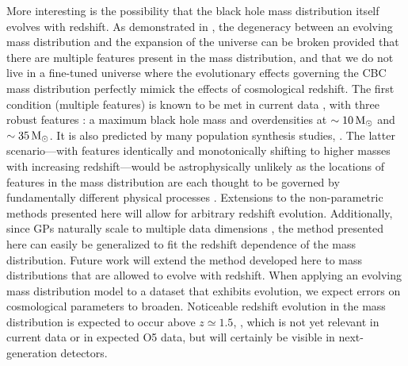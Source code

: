 \documentclass[preprint2,linenumbers]{aastex631}
\begin{document}
More interesting is the possibility that the black hole mass distribution itself evolves with redshift.
As demonstrated in \citet{ezquiaga_spectral_2022}, the degeneracy between an evolving mass distribution and the expansion of the universe can be broken provided that there are multiple features present in the mass distribution, and that we do not live in a fine-tuned universe where the evolutionary effects governing the \ac{CBC} mass distribution perfectly mimick the effects of cosmological redshift.
The first condition (multiple features) is known to be met in current data \citep{abbott_population_2023}, with three robust features \citep{farah_things_2023}: a maximum black hole mass and overdensities at $\sim10\,\text{M}_{\odot}$ and $\sim35\,\text{M}_{\odot}$.
It is also predicted by many population synthesis studies, \citep[e.g.][]{mapelli_cosmic_2018,giacobbo_merging_2018,van_son_locations_2023}.
The latter scenario---with features identically and monotonically shifting to higher masses with increasing redshift---would be astrophysically unlikely as the locations of features in the mass distribution are each thought to be governed by fundamentally different physical processes \citep{mapelli_binary_2020}.
Extensions to the non-parametric methods presented here will allow for arbitrary redshift evolution.
Additionally, since \aclp{GP} naturally scale to multiple data dimensions \citep{rasmussen_gaussian_2006}, the method presented here can easily be generalized to fit the redshift dependence of the mass distribution. 
Future work will extend the method developed here to mass distributions that are allowed to evolve with redshift.
When applying an evolving mass distribution model to a dataset that exhibits evolution, we expect errors on cosmological parameters to broaden.
Noticeable redshift evolution in the mass distribution is expected to occur above $z\simeq 1.5$, \citep{van_son_redshift_2022}, which is not yet relevant in current data or in expected O5 data, but will certainly be visible in next-generation detectors.
\end{document}
